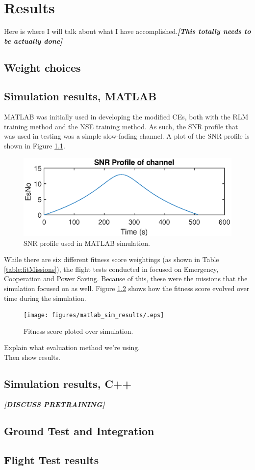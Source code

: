\chapter{Results}\label{ch:results}

\par Here is where I will talk about what I have accomplished.\textbf{\textit{[This totally needs to be actually done]}}
\section{Weight choices}

\section{Simulation results, MATLAB}
\par MATLAB was initially used in developing the modified CEs, both with the RLM training method and the NSE training method. As such, the SNR profile that was used in testing was a simple slow-fading channel. A plot of the SNR profile is shown in Figure \ref{fig:matlabSNRProf}. 

\begin{figure}[ht]
\centering
\includegraphics[scale=1]{figures/matlab_sim_results/snrPRofile_matlabsim.eps}
\caption{SNR profile used in MATLAB simulation.}
\label{fig:matlabSNRProf}
\end{figure}

\par While there are six different fitness score weightings (as shown in Table \ref{table:fitMissions}), the flight tests conducted in \cite{tim_implementation} focused on Emergency, Cooperation and Power Saving. Because of this, these were the missions that the simulation focused on as well. Figure \ref{result:matSimFitscore} shows how the fitness score evolved over time during the simulation.

\begin{figure}[ht]
\centering 
\texttt{[image: figures/matlab\_sim\_results/.eps]}
\caption{Fitness score ploted over simulation.}
\label{result:matSimFitscore}
\end{figure}
Explain what evaluation method we're using. \\
Then show results.
\section{Simulation results, C++}
\textbf{\textit{[DISCUSS PRETRAINING]}}
\section{Ground Test and Integration}
\section{Flight Test results}